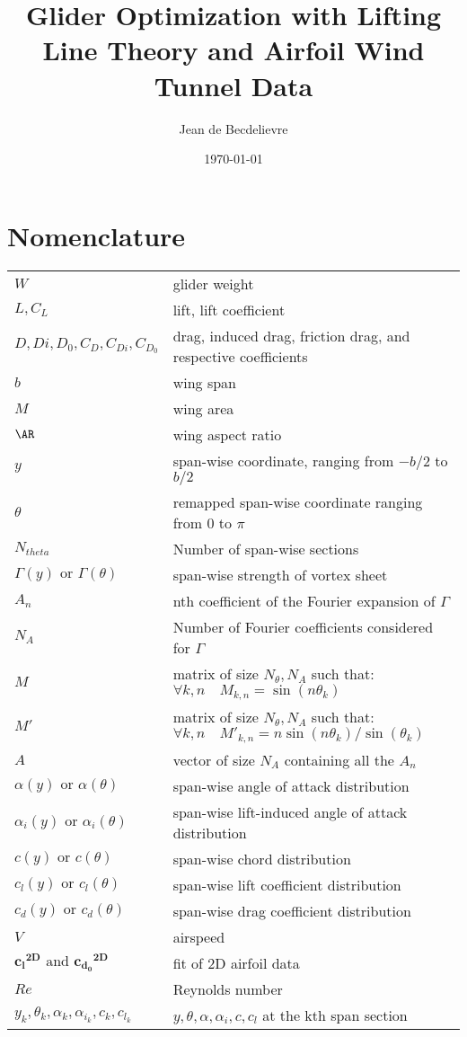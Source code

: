 \documentclass[letterpaper,12pt]{article}
\begin{document}
\newcommand{\cl}{\boldsymbol{{c_l}^{2D}}}
\newcommand{\cd}{\boldsymbol{{c_{d_0}}^{2D}}}


\title{Glider Optimization with Lifting Line Theory and Airfoil Wind Tunnel Data}
\author{Jean de Becdelievre}
\date{\today}
\maketitle

\section{Nomenclature}

{\renewcommand\arraystretch{1.0}
\noindent\begin{longtable}{@{}l @{\quad : \quad} l@{}}
$W$  & glider weight \\
$L, C_L$ & lift, lift coefficient \\
$D,Di,D_0, C_D,C_{Di},C_{D_0}$& drag, induced drag, friction drag, and respective coefficients \\
$b$ & wing span \\
$M$ & wing area \\
$\AR$ & wing aspect ratio \\
$y$ & span-wise coordinate, ranging from $-b/2$ to $b/2$ \\
$\theta$ & remapped span-wise coordinate ranging from $0$ to $\pi$ \\
$N_{theta}$ & Number of span-wise sections \\
$\Gamma(y) \text{ or } \Gamma(\theta)$ & span-wise strength of vortex sheet\\
$A_n$ & nth coefficient of the Fourier expansion of $\Gamma$ \\
$N_{A}$ & Number of Fourier coefficients considered for $\Gamma$ \\
$M$ & matrix of size $N_{\theta}, N_A$ such that: $ \forall k,n \quad M_{k,n} = \sin(n\theta_k)$ \\
$M'$ & matrix of size $N_{\theta}, N_A$ such that: $ \forall k,n \quad {M'}_{k,n} = n\sin(n\theta_k)/\sin(\theta_k)$ \\
$A$ & vector of size $N_A$ containing all the $A_n$ \\
$\alpha(y) \text{ or } \alpha(\theta)$ & span-wise angle of attack distribution\\
$\alpha_i(y) \text{ or } \alpha_i(\theta)$ & span-wise lift-induced angle of attack distribution\\
$c(y) \text{ or } c(\theta)$ & span-wise chord distribution\\
$c_l(y) \text{ or } c_l(\theta)$ & span-wise lift coefficient distribution\\
$c_d(y) \text{ or } c_d(\theta)$ & span-wise drag coefficient distribution\\
$V$ & airspeed \\
$\cl \text{ and } \cd $ & fit of 2D airfoil data \\
$Re$ & Reynolds number \\
$y_k, \theta_k, \alpha_k, \alpha_{i_k}, c_k, c_{l_k}$ &  $y, \theta, \alpha, \alpha_i, c, c_{l}$ at the kth span section\\
\end{longtable}}
\end{document}
